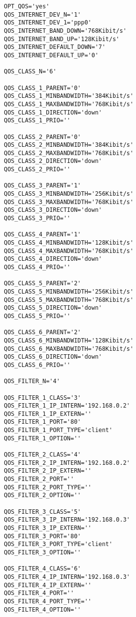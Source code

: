 \begin{small}
\begin{example}
\begin{verbatim}
OPT_QOS='yes'
QOS_INTERNET_DEV_N='1'
QOS_INTERNET_DEV_1='ppp0'
QOS_INTERNET_BAND_DOWN='768Kibit/s'
QOS_INTERNET_BAND_UP='128Kibit/s'
QOS_INTERNET_DEFAULT_DOWN='7'
QOS_INTERNET_DEFAULT_UP='0'

QOS_CLASS_N='6'

QOS_CLASS_1_PARENT='0'
QOS_CLASS_1_MINBANDWIDTH='384Kibit/s'
QOS_CLASS_1_MAXBANDWIDTH='768Kibit/s'
QOS_CLASS_1_DIRECTION='down'
QOS_CLASS_1_PRIO=''

QOS_CLASS_2_PARENT='0'
QOS_CLASS_2_MINBANDWIDTH='384Kibit/s'
QOS_CLASS_2_MAXBANDWIDTH='768Kibit/s'
QOS_CLASS_2_DIRECTION='down'
QOS_CLASS_2_PRIO=''

QOS_CLASS_3_PARENT='1'
QOS_CLASS_3_MINBANDWIDTH='256Kibit/s'
QOS_CLASS_3_MAXBANDWIDTH='768Kibit/s'
QOS_CLASS_3_DIRECTION='down'
QOS_CLASS_3_PRIO=''

QOS_CLASS_4_PARENT='1'
QOS_CLASS_4_MINBANDWIDTH='128Kibit/s'
QOS_CLASS_4_MAXBANDWIDTH='768Kibit/s'
QOS_CLASS_4_DIRECTION='down'
QOS_CLASS_4_PRIO=''

QOS_CLASS_5_PARENT='2'
QOS_CLASS_5_MINBANDWIDTH='256Kibit/s'
QOS_CLASS_5_MAXBANDWIDTH='768Kibit/s'
QOS_CLASS_5_DIRECTION='down'
QOS_CLASS_5_PRIO=''

QOS_CLASS_6_PARENT='2'
QOS_CLASS_6_MINBANDWIDTH='128Kibit/s'
QOS_CLASS_6_MAXBANDWIDTH='768Kibit/s'
QOS_CLASS_6_DIRECTION='down'
QOS_CLASS_6_PRIO=''

QOS_FILTER_N='4'

QOS_FILTER_1_CLASS='3'
QOS_FILTER_1_IP_INTERN='192.168.0.2'
QOS_FILTER_1_IP_EXTERN=''
QOS_FILTER_1_PORT='80'
QOS_FILTER_1_PORT_TYPE='client'
QOS_FILTER_1_OPTION=''

QOS_FILTER_2_CLASS='4'
QOS_FILTER_2_IP_INTERN='192.168.0.2'
QOS_FILTER_2_IP_EXTERN=''
QOS_FILTER_2_PORT=''
QOS_FILTER_2_PORT_TYPE=''
QOS_FILTER_2_OPTION=''

QOS_FILTER_3_CLASS='5'
QOS_FILTER_3_IP_INTERN='192.168.0.3'
QOS_FILTER_3_IP_EXTERN=''
QOS_FILTER_3_PORT='80'
QOS_FILTER_3_PORT_TYPE='client'
QOS_FILTER_3_OPTION=''

QOS_FILTER_4_CLASS='6'
QOS_FILTER_4_IP_INTERN='192.168.0.3'
QOS_FILTER_4_IP_EXTERN=''
QOS_FILTER_4_PORT=''
QOS_FILTER_4_PORT_TYPE=''
QOS_FILTER_4_OPTION=''

\end{verbatim}
\end{example}
\end{small}

